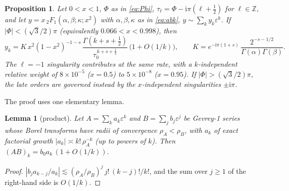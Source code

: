 \documentclass{amsart}
\numberwithin{equation}{section}
\theoremstyle{plain}
\newtheorem{proposition}{Proposition}
\newtheorem{lemma}[definition]{Lemma}
\theoremstyle{definition}
\theoremstyle{remark}
\newcommand{\eps}{\varepsilon}
\newcommand{\iu}{\mathrm{i}}
\begin{document}
\begin{proposition}\label{prop:4}
Let $0 < x < 1$, $\Phi$ as in \eqref{eq:Phi}, $\tau_\ell = \Phi - \iu\pi(\ell + \tfrac12)$ for $\ell \in \mathbb Z$, and
let $y = x\,{}_2F_1(\alpha,\beta;\kappa;x^2)$ with $\alpha, \beta, \kappa$ as in \eqref{eq:abk}, $y \sim \sum_k y_k\eps^k$.
If $|\Phi| < (\sqrt3/2)\pi$ (equivalently $0.066 < x < 0.998$), then
\begin{equation}\label{eq:prop4}
y_k = K\,x^2(1-x^2)^{-1-s}\,\frac{\Gamma(k+s+\frac12)}{\tau_0^{\,k+s+\frac12}}\,\big(1 + O(1/k)\big), \qquad
K = e^{-\iu\pi(1+s)}\,\frac{2^{-s-1/2}}{\Gamma(\alpha)\Gamma(\beta)} .
\end{equation}
The $\ell = -1$ singularity contributes at the same rate, with a $k$-independent relative weight of $8\times10^{-5}$
($x = 0.5$) to $5\times10^{-8}$ ($x = 0.95$). If $|\Phi| > (\sqrt3/2)\pi$, the late orders are governed instead by the
$x$-independent singularities $\pm\iu\pi$.
\end{proposition}

The proof uses one elementary lemma.

\begin{lemma}[product]\label{lem:product}
Let $A = \sum_k a_k\eps^k$ and $B = \sum_j b_j\eps^j$ be Gevrey-1 series whose Borel transforms have radii of convergence
$\rho_A < \rho_B$, with $a_k$ of exact factorial growth $|a_k| \asymp k!\,\rho_A^{-k}$ (up to powers of $k$). Then
$(AB)_k = b_0a_k\,(1+O(1/k))$.
\end{lemma}

\begin{proof}
$|b_ja_{k-j}/a_k| \lesssim (\rho_A/\rho_B)^j\,j!\,(k-j)!/k!$, and the sum over $j \ge 1$ of the right-hand side is
$O(1/k)$.
\end{proof}
\end{document}
